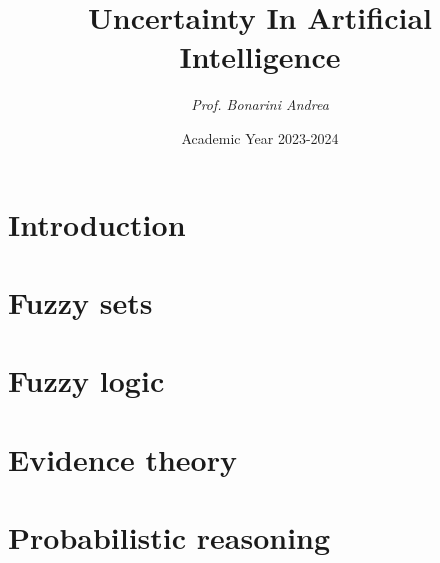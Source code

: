 \documentclass[12pt, a4paper]{report}
\title{\textbf{Uncertainty In Artificial Intelligence}}
\author{\textit{Prof. Bonarini Andrea}}
\date{Academic Year 2023-2024}
\begin{document}
    \maketitle

    

    \cleardoublepage

    \tableofcontents

    \cleardoublepage

    \chapter{Introduction}

    
    
      
    
    
    
    \chapter{Fuzzy sets}
     
    

    \chapter{Fuzzy logic}
    
    
    
    
    
    
    
    
    

    \chapter{Evidence theory}
    
    
    
    
    

    \chapter{Probabilistic reasoning}
    
    
    
\end{document}
